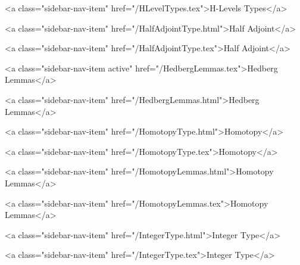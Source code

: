       
        
          <a class="sidebar-nav-item" href="/HLevelTypes.tex">H-Levels Types</a>
        
      
    
      
        
          <a class="sidebar-nav-item" href="/HalfAdjointType.html">Half Adjoint</a>
        
      
    
      
        
          <a class="sidebar-nav-item" href="/HalfAdjointType.tex">Half Adjoint</a>
        
      
    
      
        
          <a class="sidebar-nav-item active" href="/HedbergLemmas.tex">Hedberg Lemmas</a>
        
      
    
      
        
          <a class="sidebar-nav-item" href="/HedbergLemmas.html">Hedberg Lemmas</a>
        
      
    
      
        
          <a class="sidebar-nav-item" href="/HomotopyType.html">Homotopy</a>
        
      
    
      
        
          <a class="sidebar-nav-item" href="/HomotopyType.tex">Homotopy</a>
        
      
    
      
        
          <a class="sidebar-nav-item" href="/HomotopyLemmas.html">Homotopy Lemmas</a>
        
      
    
      
        
          <a class="sidebar-nav-item" href="/HomotopyLemmas.tex">Homotopy Lemmas</a>
        
      
    
      
        
          <a class="sidebar-nav-item" href="/IntegerType.html">Integer Type</a>
        
      
    
      
        
          <a class="sidebar-nav-item" href="/IntegerType.tex">Integer Type</a>
        
      
    
